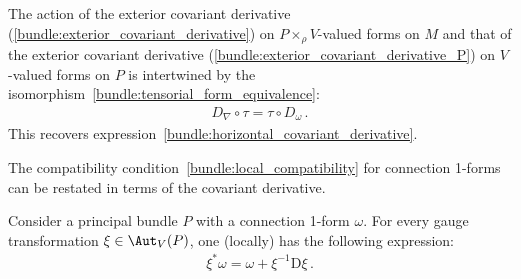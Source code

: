     \begin{property}\label{bundle:covariant_derivative_intertwiner}
        The action of the exterior covariant derivative (\cref{bundle:exterior_covariant_derivative}) on $P\times_\rho V$-valued forms on $M$ and that of the exterior covariant derivative (\cref{bundle:exterior_covariant_derivative_P}) on $V$-valued forms on $P$ is intertwined by the isomorphism~\eqref{bundle:tensorial_form_equivalence}:
        \begin{gather}
            D_\nabla\circ\tau = \tau\circ D_\omega\,.
        \end{gather}
        This recovers expression~\eqref{bundle:horizontal_covariant_derivative}.
    \end{property}

    The compatibility condition~\eqref{bundle:local_compatibility} for connection 1-forms can be restated in terms of the covariant derivative.
    \begin{property}\label{bundle:connection_gauge_transformation}
        Consider a principal bundle $P$ with a connection 1-form $\omega$. For every gauge transformation $\xi\in\Aut_V(P)$, one (locally) has the following expression:
        \begin{gather}
            \xi^*\omega = \omega + \xi^{-1}\mathrm{D}\xi\,.
        \end{gather}
    \end{property}

